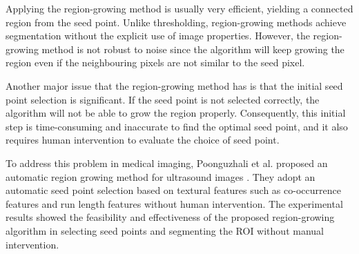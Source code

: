 \noindent Applying the region-growing method is usually very efficient, yielding a connected region from the seed point. Unlike thresholding, region-growing methods achieve segmentation without the explicit use of image properties. However, the region-growing method is not robust to noise since the algorithm will keep growing the region even if the neighbouring pixels are not similar to the seed pixel. \medskip

\noindent Another major issue that the region-growing method has is that the initial seed point selection is significant. If the seed point is not selected correctly, the algorithm will not be able to grow the region properly. Consequently, this initial step is time-consuming and inaccurate to find the optimal seed point, and it also requires human intervention to evaluate the choice of seed point. \medskip

\noindent To address this problem in medical imaging, Poonguzhali et al. proposed an automatic region growing method for ultrasound images \cite{poonguzhali2006complete}. They adopt an automatic seed point selection based on textural features such as co-occurrence features and run length features without human intervention. The experimental results showed the feasibility and effectiveness of the proposed region-growing algorithm in selecting seed points and segmenting the ROI without manual intervention.\medskip

